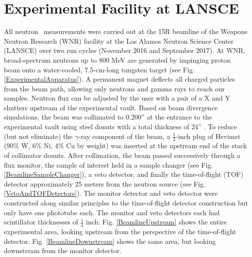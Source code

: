 \section{Experimental Facility at LANSCE}
All neutron \tot\ measurements were carried out at the 15R
beamline of the Weapons Neutron Research (WNR) facility at the Los Alamos
Neutron Science Center (LANSCE) over two run cycles (November 2016 and
September 2017). At WNR, broad-spectrum neutrons up
to 800 MeV are generated by impinging proton beam onto a water-cooled, 7.5-cm-long
tungsten target (see Fig. \ref{ExperimentalApparatus}). A 
permanent magnet deflects all charged particles from the beam path, 
allowing only neutrons and gamma rays to reach our samples. Neutron flux can be
adjusted by the user with a pair of a X and Y shutters upstream of the
experimental vault. Based on beam divergence
simulations, the beam was collimated to 0.200'' at  the entrance to the
experimental vault using steel donuts with a total thickness of 24'' .
To reduce (but not eliminate) the $\gamma$-ray component of the beam,
a $\frac{1}{2}$-inch plug of Hevimet (90\% W, 6\% 
Ni, 4\% Cu by weight) was inserted at the upstream end of the
stack of collimator donuts. After collimation, the beam passed successively through a flux 
monitor, the sample of interest held in a sample changer (see Fig.
\ref{BeamlineSampleChanger}), a veto detector, and finally the 
time-of-flight (TOF) detector approximately 25 meters from the neutron source (see Fig.
\ref{VetoAndTOFDetectors}). The monitor detector and veto detector
were constructed along similar principles to the time-of-flight
detector construction but only have one phototube each. The monitor and
veto detectors each had scintillator thicknesses of $\frac{1}{4}$ inch.
Fig. \ref{BeamlineUpstream} shows the entire experimental area, looking upstream
from the perspective of the time-of-flight
detector. Fig. \ref{BeamlineDownstream} shows the same area, but looking
downstream from the monitor detector.

